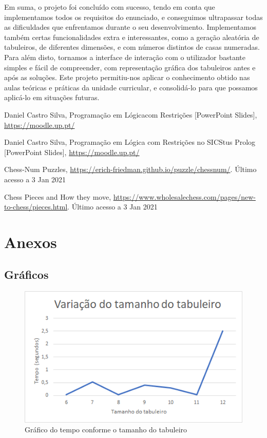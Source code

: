 \documentclass[runningheads]{llncs}
\begin{document}
Em suma, o projeto foi concluído com sucesso, tendo em conta que implementamos todos os requisitos do enunciado, e conseguimos ultrapassar todas as dificuldades que enfrentamos durante o seu desenvolvimento.
Implementamos também certas funcionalidades extra e interessantes, como a geração aleatória de tabuleiros, de diferentes dimensões, e com números distintos de casas numeradas. Para além disto, tornamos a interface de interação com o utilizador bastante simples e fácil de compreender,
com representação gráfica dos tabuleiros antes e após as soluções. Este projeto permitiu-nos aplicar o conhecimento obtido nas aulas teóricas e práticas da unidade curricular, e consolidá-lo para que possamos aplicá-lo em situações futuras.

%
%
\newpage
\begin{thebibliography}{8}
Daniel Castro Silva, Programação em Lógicacom Restrições [PowerPoint Slides], \url{https://moodle.up.pt/}

Daniel Castro Silva, Programação em Lógica com Restrições no SICStus Prolog [PowerPoint Slides], \url{https://moodle.up.pt/}

Chess-Num Puzzles, \url{https://erich-friedman.github.io/puzzle/chessnum/}. Último acesso a 3
Jan 2021

Chess Pieces and How they move, \url{https://www.wholesalechess.com/pages/new-to-chess/pieces.html}. Último acesso a 3
Jan 2021

\end{thebibliography}

\newpage
\section{Anexos}
\subsection{Gráficos}
\begin{figure}
    \centering
    \includegraphics[scale=0.5]{./images/tamanhotabuleiro.png}
    \caption{Gráfico do tempo conforme o tamanho do tabuleiro} \label{fig1}
\end{figure}
\end{document}
